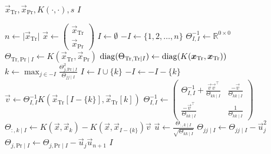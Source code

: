 \begin{algorithmic}[1]
  \REQUIRE \( \vec{x}_\text{Tr}, \vec{x}_\text{Pr}, K(\cdot, \cdot), s \)
  \ENSURE \( I \)

  \STATE \( n \gets \lvert \vec{x}_\text{Tr} \rvert \)
  \STATE \(
    \vec{x} \gets
    \begin{pmatrix}
      \vec{x}_\text{Tr} \\
      \vec{x}_\text{Pr}
    \end{pmatrix}
  \)
  \STATE \( I \gets \emptyset \)
  \STATE \( -I \gets \{ 1, 2, \dotsc, n \} \)
  \STATE \( \Theta_{I, I}^{-1} \gets \mathbb{R}^{0 \times 0} \)
  \STATE \(
    \Theta_{\text{Tr}, \text{Pr} \mid I} \gets
    K(\vec{x}_\text{Tr}, \vec{x}_\text{Pr})
  \)
  \STATE \(
    \operatorname{diag}(\Theta_{\text{Tr}, \text{Tr} \mid I}) \gets
    \operatorname{diag}(K(\bm{x}_\text{Tr}, \bm{x}_\text{Tr}))
  \)
    \STATE \(
      k \gets \max_{j \in -I}
      \frac{\Theta_{j, \text{Pr} \mid I}^2}{\Theta_{jj \mid I}}
    \)
    \STATE \( I \gets I \cup \{ k \} \)
    \STATE \( -I \gets -I - \{ k \} \)
    \STATE \(
      \vec{v} \gets \Theta_{I, I}^{-1}
      K(\vec{x}_\text{Tr}[I - \{ k \}], \vec{x}_\text{Tr}[k])
    \)
    \STATE \(
      \Theta_{I, I}^{-1} \gets
      \begin{pmatrix}
        \Theta_{I, I}^{-1} +
        \frac{\vec{v} \vec{v}^{\top}}{\Theta_{kk \mid I}} &
        \frac{-\vec{v}}{\Theta_{kk \mid I}} \\
        \frac{-\vec{v}^{\top}}{\Theta_{kk \mid I}} &
        \frac{1}{\Theta_{kk \mid I}}
      \end{pmatrix}
    \)
    \STATE \(
      \Theta_{:, k \mid I} \gets
      K(\vec{x}, \vec{x}_k) -
      K(\vec{x}, \vec{x}_{I - \{ k \}}) \vec{v}
    \)
    \STATE \(
      \vec{u} \gets
      \frac{\Theta_{:, k \mid I}}{\sqrt{\Theta_{kk \mid I}}}
    \)
      \STATE \(
        \Theta_{jj \mid I} \gets
        \Theta_{jj \mid I} -
        \vec{u}_j^2
      \)
      \STATE \(
        \Theta_{j, \text{Pr} \mid I} \gets
        \Theta_{j, \text{Pr} \mid I} -
        \vec{u}_j \vec{u}_{n + 1}
      \)
    \ENDFOR
  \ENDWHILE
  \RETURN \( I \)
\end{algorithmic}
